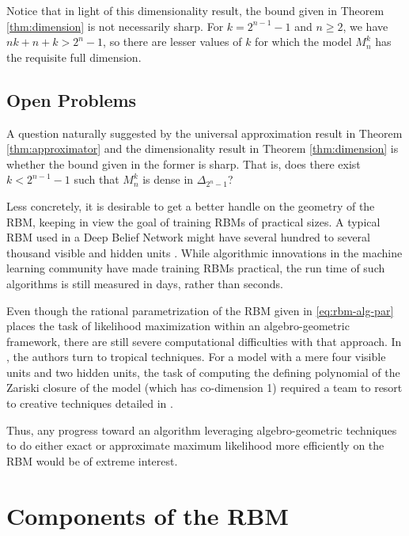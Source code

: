 \documentclass[11pt,titlepage]{article}
\numberwithin{equation}{section}
\begin{document}
    Notice that in light of this dimensionality result, the bound given in
    Theorem \ref{thm:dimension} is not necessarily sharp.  For $k = 2^{n-1}-1$
    and $n \ge 2$, we have $nk+n+k > 2^n-1$, so there are lesser values of $k$
    for which the model $M_n^k$ has the requisite full dimension.

\subsection{Open Problems}

    A question naturally suggested by the universal approximation result in
    Theorem \ref{thm:approximator} and the dimensionality result in Theorem
    \ref{thm:dimension} is whether the bound given in the former is sharp.  That
    is, does there exist $k < 2^{n-1}-1$ such that $M_n^k$ is dense in
    $\Delta_{2^n-1}$?

    Less concretely, it is desirable to get a better handle on the geometry of
    the RBM, keeping in view the goal of training RBMs of practical sizes.  A
    typical RBM used in a Deep Belief Network might have several hundred to
    several thousand visible and hidden units \cite{Hin07}.  While algorithmic
    innovations in the machine learning community have made training RBMs
    practical, the run time of such algorithms is still measured in days, rather
    than seconds.
    
    Even though the rational parametrization of the RBM given in
    \eqref{eq:rbm-alg-par} places the task of likelihood maximization within an
    algebro-geometric framework, there are still severe computational
    difficulties with that approach.  In \cite{CMS09}, the authors turn to
    tropical techniques.  For a model with a mere four visible units and two
    hidden units, the task of computing the defining polynomial of the Zariski
    closure of the model (which has co-dimension 1) required a team to resort
    to creative techniques detailed in \cite{CTY10}.  

    Thus, any progress toward an algorithm leveraging algebro-geometric
    techniques to do either exact or approximate maximum likelihood
    more efficiently on the RBM would be of extreme interest.


\section{Components of the RBM}
\end{document}
